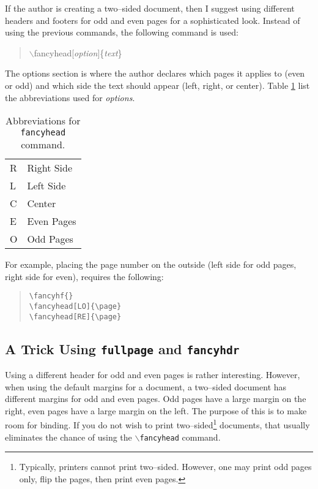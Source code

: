 \documentclass{article}
\begin{document}
If the author is creating a two--sided document, then I suggest using different headers and footers for odd and even pages for a sophisticated look. Instead of using the previous commands, the following command is used:
\begin{quote}
$\backslash$fancyhead[\textit{option}]\{\textit{text}\}
\end{quote}
The options section is where the author declares which pages it applies to (even or odd) and which side the text should appear (left, right, or center). Table \ref{tbl:fancyhdr} list the abbreviations used for \textit{options}.
\begin{table}[!hb]\label{tbl:fancyhdr}
	\begin{center}
	\begin{tabular}{l|l} 
		\hline
		R & Right Side \\
		L & Left Side	 \\
		C & Center	   \\
		\hline
		E & Even Pages \\
		O & Odd Pages  \\
		\hline
	\end{tabular} \caption{Abbreviations for \texttt{fancyhead} command.}
	\end{center}
\end{table}

For example, placing the page number on the outside (left side for odd pages, right side for even), requires the following:
\begin{quote}
\begin{verbatim}
\fancyhf{}
\fancyhead[LO]{\page}
\fancyhead[RE]{\page}
\end{verbatim}
\end{quote}

\subsection{A Trick Using \texttt{fullpage} and \texttt{fancyhdr}}

Using a different header for odd and even pages is rather interesting. However, when using the default margins for a document, a two--sided document has different margins for odd and even pages. Odd pages have a large margin on the right, even pages have a large margin on the left. The purpose of this is to make room for binding. If you do not wish to print two--sided\footnote{Typically, printers cannot print two--sided. However, one may print odd pages only, flip the pages, then print even pages.} documents, that usually eliminates the chance of using the \texttt{$\backslash$fancyhead} command.
\end{document}
